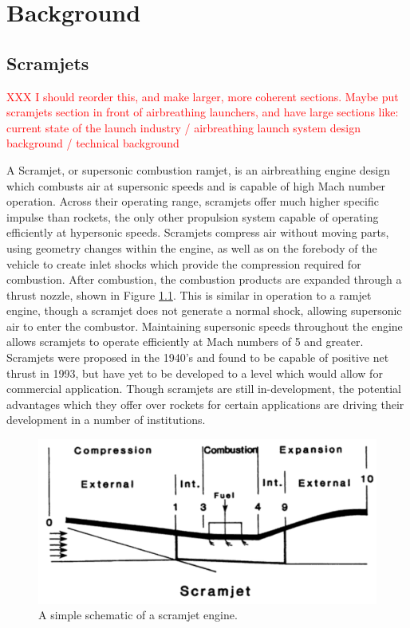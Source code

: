       
      
      \chapter{Background}
    
    
    \section{Scramjets}
    
    
    \textcolor{red}{XXX I should reorder this, and make larger, more coherent sections. Maybe put scramjets section in front of airbreathing launchers, and have large sections like: current state of the launch industry / airbreathing launch system design background / technical background}
    
    
    
    
    A Scramjet, or supersonic combustion ramjet, is an airbreathing engine design which combusts air at supersonic speeds and is capable of high Mach number operation. 
    Across their operating range, scramjets offer much higher specific impulse than rockets, the only other propulsion system capable of operating efficiently at hypersonic speeds\cite{Billig1993,Cook2003}.
    Scramjets compress air without moving parts, using geometry changes within the engine\cite{Curran2001a}, as well as on the forebody of the vehicle to create inlet shocks which provide the compression required for combustion\cite{Smart2012}. After combustion, the combustion products are expanded through a thrust nozzle, shown in Figure \ref{fig:scramjet}. This is similar in operation to a ramjet engine, though a scramjet does not generate a normal shock, allowing supersonic air to enter the combustor. Maintaining supersonic speeds throughout the engine allows scramjets to operate efficiently at Mach numbers of 5 and greater. 
    Scramjets were proposed in the 1940's\cite{Curran2001} and found to be capable of positive net thrust in 1993\cite{Paull1993}, but have yet to be developed to a level which would allow for commercial application. 
    Though scramjets are still in-development, the potential advantages which they offer over rockets for certain applications are driving their development in a number of institutions\cite{Curran2001b}.
    \begin{figure}[ht]
    	\centering
    	\includegraphics[width=0.7\linewidth]{figures/2_literature-review/scramjet}
    	\caption{A simple schematic of a scramjet engine\cite{Heiser1994}.}
    	\label{fig:scramjet}
    \end{figure}
    

